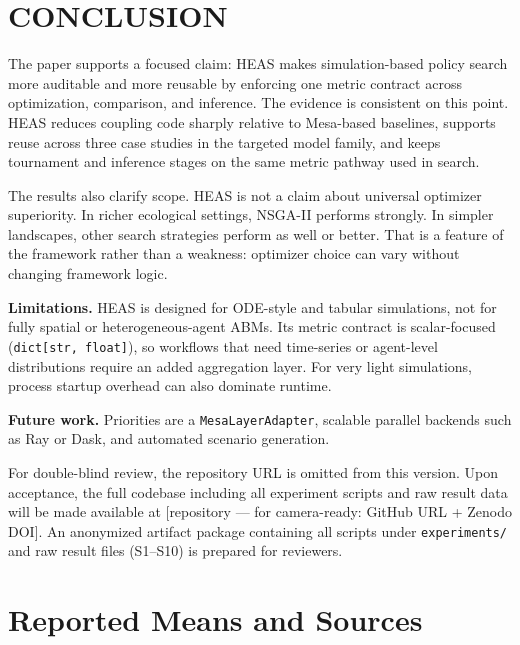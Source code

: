 \documentclass{wscpaperproc}
\begin{document}
\section{CONCLUSION}

The paper supports a focused claim: HEAS makes simulation-based policy search
more auditable and more reusable by enforcing one metric contract across
optimization, comparison, and inference. The evidence is consistent on this
point. HEAS reduces coupling code sharply relative to Mesa-based baselines,
supports reuse across three case studies in the targeted model family, and
keeps tournament and inference stages on the same metric pathway used in search.

The results also clarify scope. HEAS is not a claim about universal optimizer
superiority. In richer ecological settings, NSGA-II performs strongly. In
simpler landscapes, other search strategies perform as well or better. That is
a feature of the framework rather than a weakness: optimizer choice can vary
without changing framework logic.

\textbf{Limitations.} HEAS is designed for ODE-style and tabular simulations,
not for fully spatial or heterogeneous-agent ABMs. Its metric contract is
scalar-focused (\texttt{dict[str, float]}), so workflows that need time-series or
agent-level distributions require an added aggregation layer. For very light
simulations, process startup overhead can also dominate runtime.

\textbf{Future work.} Priorities are a \texttt{MesaLayerAdapter}, scalable
parallel backends such as Ray or Dask, and automated scenario generation.

For double-blind review, the repository URL is omitted from this version.
Upon acceptance, the full codebase including all experiment scripts and raw
result data will be made available at [repository --- for camera-ready: GitHub
URL + Zenodo DOI]. An anonymized artifact package containing all scripts
under \texttt{experiments/} and raw result files (S1--S10) is prepared for
reviewers.

\appendix
\section{Reported Means and Sources}
\end{document}
